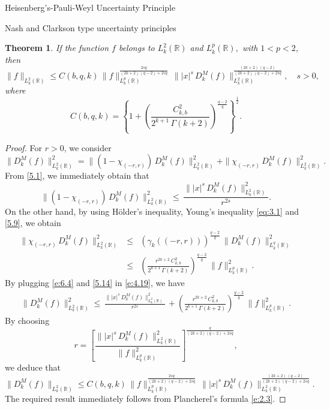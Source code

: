 \documentclass[12pt,a4paper,reqno]{amsproc}
\newtheorem{theorem}{Theorem}[section]
\theoremstyle{definition}
\theoremstyle{remark}
\numberwithin{equation}{section}
\begin{document}
\begin{subsection}{Heisenberg's-Pauli-Weyl Uncertainty Principle}
\begin{subsection}{Nash and Clarkson type uncertainty principles}
\begin{theorem} If the function $f$ belongs to $L_k^2(\mathbb{R})$ and $ L_k^p(\mathbb{R}), $  with $1<p<2$, then 
\begin{equation*}
    \|f\|_{L_k^2(\mathbb{R})}\le C(b,q,k)\, \|f\|^{\frac{2sq}{(2k+2)\,(q-2)+2sq}}_{L_k^p(\mathbb{R})}\,\||x|^s\,D_k^M(f)\|_{L_k^2(\mathbb{R})}^{\frac{(2k+2)\,(q-2)}{(2k+2)\,(q-2)+2sq}},\quad s>0,
\end{equation*}
where
\begin{equation*}
 C(b,q,k)=   \left\{1+\left(\frac{C_{k,b}^2}{2^{k+1}\, \Gamma(k+2)}\right)^{\frac{q-2}{q}}\right\}^{\frac{1}{2}}.
\end{equation*}
\end{theorem}
\begin{proof}
    For $r>0$, we consider 
\begin{equation}\label{e:4.19}
\|D_k^M(f)\|^2_{L_k^2(\mathbb{R})} =  \|(1-\chi_{(-r,r)})\, D_k^M(f)\|^2_{L_k^2(\mathbb{R})}+ \|\chi_{(-r,r)}\, D_k^M(f)\|^2_{L_k^2(\mathbb{R})}.
\end{equation}
From \eqref{5.1}, we immediately obtain that
\begin{equation}\label{e:6.4}
    \|(1-\chi_{(-r,r)})\, D_k^M(f)\|^2_{L_k^2(\mathbb{R})} \le \,\frac{\||x|^s\,D_k^M(f)\|^2_{L_k^2(\mathbb{R})}}{r^{2s}}.
\end{equation}
On the other hand, by using H{\"o}lder's inequality, Young's inequality \eqref{eq:3.1} and \eqref{5.9}, we obtain 
\begin{eqnarray} \label{5.14}
\nonumber   \|\chi_{(-r,r)}\, D_k^M(f)\|^2_{L_k^2(\mathbb{R})}&\le& \left(\gamma_k((-r,r))\right)^{\frac{q-2}{q}} \, \|D_k^M(f)\|^2_{L_k^{q}(\mathbb{R})}\\
&\le& \left(\frac{r^{2k+2}\,C_{k,b}^2}{2^{k+1}\, \Gamma(k+2)}\right)^{\frac{q-2}{q}}\,\|f\|^2_{L^p_k(\mathbb{R})}.
\end{eqnarray}
By plugging  \eqref{e:6.4} and \eqref{5.14} in \eqref{e:4.19}, we have \begin{multline*} 
\|D_k^M(f)\|^2_{L_k^2(\mathbb{R})} \le  \,\frac{\||x|^s\,D_k^M(f)\|^2_{L_k^2(\mathbb{R})}}{r^{2s}}\,+ \left(\frac{r^{2k+2}\,C_{k,b}^2}{2^{k+1}\, \Gamma(k+2)}\right)^{\frac{q-2}{q}}\,\|f\|^2_{L^p_k(\mathbb{R})}. 
\end{multline*}
 By choosing \begin{equation*}
    r = \left[\frac{\||x|^s\,D_k^M(f)\|^2_{L_k^2(\mathbb{R})} }{\|f\|^2_{L^p_k(\mathbb{R})}}\right]^{\frac{q}{(2k+2)(q-2)+2sq}},
\end{equation*}
 we deduce that
\begin{equation*}
  \|D_k^M(f)\|_{L_k^2(\mathbb{R})}\le C(b,q,k)\, \|f\|^{\frac{2sq}{(2k+2)\,(q-2)+2sq}}_{L_k^p(\mathbb{R})}\,\||x|^s\,D_k^M(f)\|_{L_k^2(\mathbb{R})}^{\frac{(2k+2)\,(q-2)}{(2k+2)\,(q-2)+2sq}}.   
\end{equation*}
 The required result immediately follows from Plancherel's formula \eqref{e:2.3}.
\end{proof}


\end{subsection}
\end{subsection}
\end{document}

